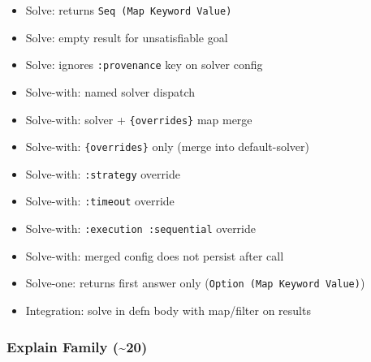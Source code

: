 \documentclass[11pt]{article}
\begin{document}
\begin{itemize}
\item Solve: returns \texttt{Seq (Map Keyword Value)}
\item Solve: empty result for unsatisfiable goal
\item Solve: ignores \texttt{:provenance} key on solver config
\item Solve-with: named solver dispatch
\item Solve-with: solver + \texttt{\{overrides\}} map merge
\item Solve-with: \texttt{\{overrides\}} only (merge into default-solver)
\item Solve-with: \texttt{:strategy} override
\item Solve-with: \texttt{:timeout} override
\item Solve-with: \texttt{:execution :sequential} override
\item Solve-with: merged config does not persist after call
\item Solve-one: returns first answer only (\texttt{Option (Map Keyword Value)})
\item Integration: solve in defn body with map/filter on results
\end{itemize}
\subsubsection{Explain Family (\textasciitilde{}20)}
\label{sec:orgef896bd}
\end{document}
